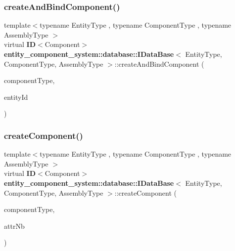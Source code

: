 \subsubsection{create\+And\+Bind\+Component()}
{\footnotesize\ttfamily template$<$typename Entity\+Type , typename Component\+Type , typename Assembly\+Type $>$ \\
virtual {\bf ID}$<$Component$>$ {\bf entity\+\_\+component\+\_\+system\+::database\+::\+I\+Data\+Base}$<$ Entity\+Type, Component\+Type, Assembly\+Type $>$\+::create\+And\+Bind\+Component (\begin{DoxyParamCaption}\item[{Component\+Type const}]{component\+Type,  }\item[{{\bf ID}$<$ Entity $>$ const \&}]{entity\+Id }\end{DoxyParamCaption})\hspace{0.3cm}{\ttfamily [pure virtual]}}

\label{classentity__component__system_1_1database_1_1_i_data_base_a7015be247d4bbc4497c6965c7f29af2a} 
\subsubsection{create\+Component()}
{\footnotesize\ttfamily template$<$typename Entity\+Type , typename Component\+Type , typename Assembly\+Type $>$ \\
virtual {\bf ID}$<$Component$>$ {\bf entity\+\_\+component\+\_\+system\+::database\+::\+I\+Data\+Base}$<$ Entity\+Type, Component\+Type, Assembly\+Type $>$\+::create\+Component (\begin{DoxyParamCaption}\item[{Component\+Type const}]{component\+Type,  }\item[{unsigned const}]{attr\+Nb }\end{DoxyParamCaption})\hspace{0.3cm}{\ttfamily [pure virtual]}}

\label{classentity__component__system_1_1database_1_1_i_data_base_ade6b15fec900be773f3ef01f04dc1bb2} 

